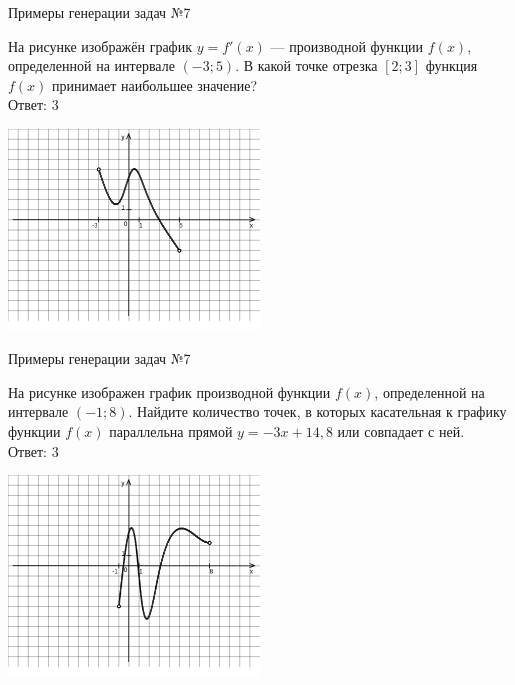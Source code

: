 \documentclass[aspectratio=169,12pt]{beamer}
\begin{document}
\begin{frame}{Примеры генерации задач №7}
    
    \begin{multicols}{2}
        На рисунке изображён график $y=f' (x)$ — производной функции $f (x)$, определенной на интервале $ (-3;5)$. В какой точке отрезка $[2; 3]$ функция $f (x)$ принимает наибольшее значение?\\

        Ответ: $3$

        \includegraphics[width=0.5\textwidth]{images/9299084059373277n0}
    \end{multicols}
          
\end{frame}

\begin{frame}{Примеры генерации задач №7}
    
    \begin{multicols}{2}
        На рисунке изображен график производной функции $f (x)$, определенной на интервале $ (-1; 8)$. Найдите количество точек, в которых касательная к графику функции $f (x)$ параллельна прямой $y=-3x+ 14{,}8 $ или совпадает с ней.\\

        Ответ: $3$

        \includegraphics[width=0.5\textwidth]{images/776525944899729n0}
      \end{multicols}
        
   
\end{frame}
\end{document}
